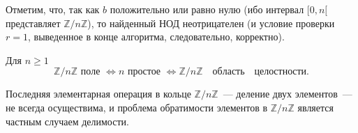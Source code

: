 
    Отметим, что, так как $b$ положительно или равно нулю (ибо интервал $[0, n [$ представляет $\mathbb{Z}/n\mathbb{Z}$), то найденный НОД неотрицателен (и \linebreak условие проверки $r = 1$, выведенное в конце алгоритма, следовательно, \linebreak корректно).

    \begin{sled}
    \hspace*{0.5cm}
    Для $n \geqslant 1$
    $$\mathbb{Z}/n\mathbb{Z}\,\,\mathrm{поле}\,\,\Leftrightarrow n\,\,\mathrm{простое}\,\,\Leftrightarrow \mathbb{Z}/n\mathbb{Z}\quad \mathrm{область\quad целостности}.$$
    \end{sled}
    Последняя элементарная операция в кольце $\mathbb{Z}/n\mathbb{Z}$~— деление двух элементов~— не всегда
    осуществима, и проблема обратимости элементов в $\mathbb{Z}/n\mathbb{Z}$ является частным случаем делимости.

